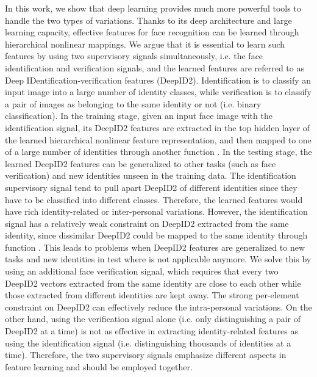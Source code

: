\documentclass{article} \usepackage{nips14submit_e,times}
\begin{document}
In this work, we show that deep learning provides much more powerful tools to handle the two types of variations. Thanks to its deep architecture and large learning capacity, effective features for face recognition can be learned through hierarchical nonlinear mappings. We argue that it is essential to learn such features by using two supervisory signals simultaneously, i.e. the face identification and verification signals, and the learned features are referred to as Deep IDentification-verification features (DeepID2). Identification is to classify an input image into a large number of identity classes, while verification is to classify a pair of images as belonging to the same identity or not (i.e. binary classification). In the training stage, given an input face image with the identification signal, its DeepID2 features are extracted in the top hidden layer of the learned hierarchical nonlinear feature representation, and then mapped to one of a large number of identities through another function . In the testing stage, the learned DeepID2 features can be generalized to other tasks (such as face verification) and new identities unseen in the training data. The identification supervisory signal tend to pull apart DeepID2 of different identities since they have to be classified into different classes. Therefore, the learned features would have rich identity-related or inter-personal variations. However, the identification signal has a relatively weak constraint on DeepID2 extracted from the same identity, since dissimilar DeepID2 could be mapped to the same identity through function . This leads to problems when DeepID2 features are generalized to new tasks and new identities in test where  is not applicable anymore. We solve this by using an additional face verification signal, which requires that every two DeepID2 vectors extracted from the same identity are close to each other while those extracted from different identities are kept away. The strong per-element constraint on DeepID2 can effectively reduce the intra-personal variations.
On the other hand, using the verification signal alone (i.e. only distinguishing a pair of DeepID2 at a time) is not as effective in extracting identity-related features as using the identification signal (i.e. distinguishing thousands of identities at a time).  Therefore, the two supervisory signals emphasize different aspects in feature learning and should be employed together.
\end{document}
